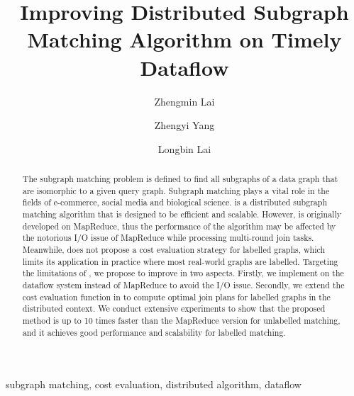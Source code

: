 \documentclass[conference]{IEEEtran}
\begin{document}
\title{Improving Distributed Subgraph Matching Algorithm on Timely Dataflow}

\author[1]{Zhengmin Lai}
\author[2]{Zhengyi Yang}
\author[2]{Longbin Lai}

\maketitle

\begin{abstract}
The subgraph matching problem is defined to find all subgraphs of a data graph that are isomorphic to a given query graph. Subgraph matching plays a vital role in the fields of e-commerce, social media and biological science. \cliquejoin is a distributed subgraph matching algorithm that is designed to be efficient and scalable. However, \cliquejoin is originally developed on MapReduce, thus the performance of the algorithm may be affected by the notorious I/O issue of MapReduce while processing multi-round join tasks. Meanwhile, \cliquejoin does not propose a cost evaluation strategy for labelled graphs, which limits its application in practice where most real-world graphs are labelled. Targeting the limitations of \cliquejoin, we propose \gencliqjoin to improve \cliquejoin in two aspects. Firstly, we implement \gencliqjoin on the \timely dataflow system instead of MapReduce to avoid the I/O issue. Secondly, we extend the cost evaluation function in \cliquejoin to compute optimal join plans for labelled graphs in the distributed context. We conduct extensive experiments to show that the proposed method is up to 10 times faster than the MapReduce version for unlabelled matching, and it achieves good performance and scalability for labelled matching.
\end{abstract}

\begin{IEEEkeywords}
 subgraph matching, cost evaluation, distributed algorithm, dataflow
\end{IEEEkeywords}















\end{document}
